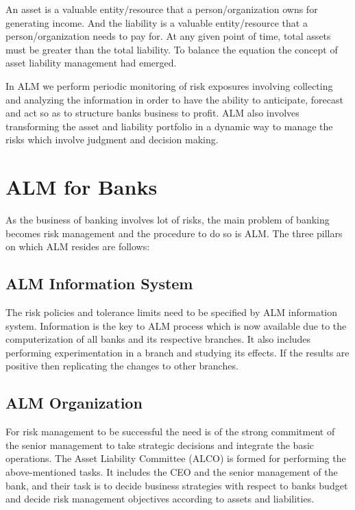 	An asset is a valuable entity/resource that a person/organization owns for generating income.  And the liability is a valuable entity/resource that a person/organization needs to pay for. At any given point of time, total assets must be greater than the total liability. To balance the equation the concept of asset liability management \cite{11} had emerged. 

	In ALM we perform periodic monitoring of risk exposures involving collecting and analyzing the information in order to have the ability to anticipate, forecast and act so as to structure banks business to profit. ALM also involves transforming the asset and liability portfolio in a dynamic way to manage the risks which involve judgment and decision making.



	
\section{ALM for Banks}

	As the business of banking involves lot of risks, the main problem of banking becomes risk management and the procedure to do so is ALM. The three pillars on which ALM resides are follows:

	\subsection{ALM Information System}
		The risk policies and tolerance limits need to be specified by ALM information system. Information is the key to ALM process which is now available due to the computerization of all banks and its respective branches. It also includes performing experimentation in a branch and studying its effects. If the results are positive then replicating the changes to other branches.

	\subsection{ALM Organization}
		For risk management to be successful the need is of the strong commitment of the senior management to take strategic decisions and integrate the basic operations. The Asset Liability Committee (ALCO) is formed for performing the above-mentioned tasks. It includes the CEO and the senior management of the bank, and their task is to decide business strategies with respect to banks budget and decide risk management objectives according to assets and liabilities. 

